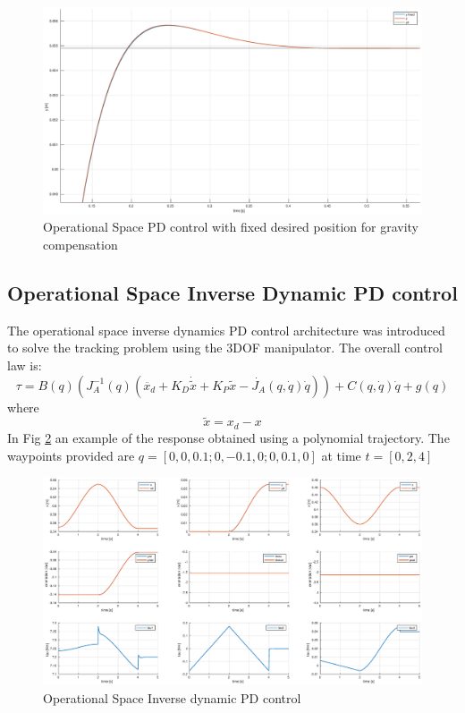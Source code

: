 \documentclass[a4paper,12pt]{article}
\begin{document}
\begin{figure}[H]
    \begin{center}
        \includegraphics[scale=0.3]{images/op_with_fixed.eps}
    \end{center}
    \caption{Operational Space PD control with fixed desired position for gravity compensation}
    \label{fig:fixed_op}
\end{figure}

\newpage
\subsection{Operational Space Inverse Dynamic PD control}

The operational space inverse dynamics PD control architecture was introduced to solve the tracking problem using the 3DOF manipulator. The overall control law is:
\[
    \tau = B(q)\left(J_{A}^{-1}(q)(\ddot{x_d}+K_D\dot{\tilde{x}}+K_P\tilde{x}-\dot{J_A}(q,\dot{q})\dot{q})\right)+ C(q,\dot{q})\dot{q} + g(q)
\]
where
\[
    \tilde{x} = x_d - x
\]
In Fig \ref{fig:op_inv_dyn} an example of the response obtained using a polynomial trajectory. The waypoints provided are $ q = [0,0,0.1;0,-0.1,0;0,0.1,0] $ at time $t = [ 0, 2, 4 ] $
\begin{figure}[H]
    \begin{center}
        \hspace*{-4.5cm}
        \includegraphics[scale=0.5]{images/op_inv_dyn.eps}
    \end{center}
    \caption{Operational Space Inverse dynamic PD control}
    \label{fig:op_inv_dyn}
\end{figure}
\end{document}
